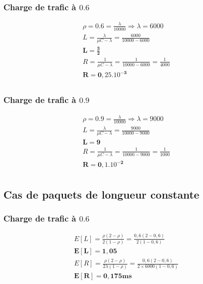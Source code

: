 \documentclass[12pt, a4paper]{article}
\begin{document}
\subsubsection{Charge de trafic \`a $0.6$}

\begin{gather*}
\rho = 0.6 = \frac{\lambda}{10000} \Rightarrow \lambda = 6000 \\
L = \frac{\lambda}{\mu C - \lambda} = \frac{6000}{10000 - 6000} \\
\bm{L = \frac{3}{2}} \\
R = \frac{1}{\mu C - \lambda} = \frac{1}{10000 - 6000} = \frac{1}{4000} \\
\bm{R = 0,25.10^{-3}} \\
\end{gather*}

\subsubsection{Charge de trafic \`a $0.9$}

\begin{gather*}
\rho = 0.9 = \frac{\lambda}{10000} \Rightarrow \lambda = 9000 \\
L = \frac{\lambda}{\mu C - \lambda} = \frac{9000}{10000 - 9000} \\
\bm{L = 9} \\
R = \frac{1}{\mu C - \lambda} = \frac{1}{10000 - 9000} = \frac{1}{1000} \\
\bm{R = 0,1.10^{-2}} \\
\end{gather*}

\subsection{Cas de paquets de longueur constante}

\subsubsection{Charge de trafic \`a $0.6$}

\begin{gather*}
E[L] = \frac{\rho(2-\rho)}{2(1-\rho)} = \frac{0,6(2-0,6)}{2(1-0,6)} \\
\bm{E[L] = 1,05} \\
E[R] = \frac{\rho(2-\rho)}{2\lambda(1-\rho)} = \frac{0,6(2-0,6)}{2\times6000(1-0,6)} \\
\bm{E[R] =0,175ms}
\end{gather*}
\end{document}
